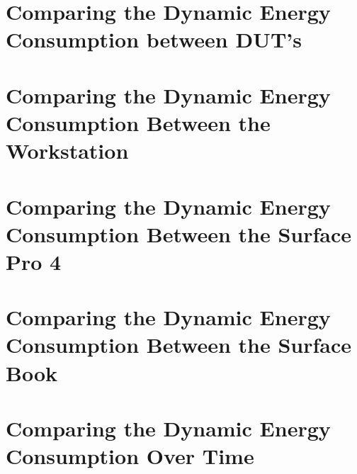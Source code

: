 \section{Comparing the Dynamic Energy Consumption between DUT's}\label{app:comparison}
% 
% 


\section{Comparing the Dynamic Energy Consumption Between the Workstation}\label{app:comparison_workstation}
% 
% 

\section{Comparing the Dynamic Energy Consumption Between the Surface Pro 4}\label{app:comparison_surfacepro4}
% 
% 

\section{Comparing the Dynamic Energy Consumption Between the Surface Book}\label{app:comparison_surfacebook}
% 
% 

\section{Comparing the Dynamic Energy Consumption Over Time}\label{app:iterations}
% 
% 


